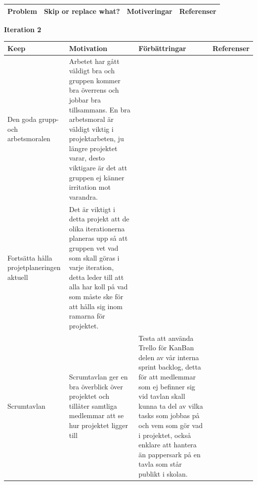 \documentclass[conference,a4paper]{IEEEtran}
\newcommand\Tstrut{\rule{0pt}{2.6ex}}       %
\newcommand\Bstrut{\rule[-0.9ex]{0pt}{0pt}} %
\newcommand{\TBstrut}{\Tstrut\Bstrut} %
\begin{document}
\begin{table}[H]
	\small
  \centering
	\begin{tabular}{|p{1.5cm}|p{2cm}|p{1.8cm}|p{1.5cm}|} %
    \hline
    Problem & Skip or replace what? & Motiveringar & Referenser \TBstrut \\
    \hline
  \end{tabular}
\end{table}

\textbf{Iteration 2}


\begin{table}[H]
	\small
  \centering
	\begin{tabular}{|p{1.5cm}|p{2cm}|p{1.8cm}|p{1.5cm}|} %
    \hline
    Keep & Motivation & Förbättringar & Referenser \TBstrut \\
    \hline
    Den goda grupp- och arbetsmoralen & Arbetet har gått väldigt bra och gruppen kommer bra överrens och jobbar bra tillsammans. En bra arbetsmoral är väldigt viktig i projektarbeten, ju längre projektet varar, desto viktigare är det att gruppen ej känner irritation mot varandra. &  & \TBstrut \\
    \hline
    Fortsätta hålla projetplaneringen aktuell & Det är viktigt i detta projekt att de olika iterationerna planeras upp så att gruppen vet vad som skall göras i varje iteration, detta leder till att alla har koll på vad som måste ske för att hålla sig inom ramarna för projektet. & & \TBstrut \\
    \hline
    Scrumtavlan & Scrumtavlan ger en bra överblick över projektet och tillåter samtliga medlemmar att se hur projektet ligger till & Testa att använda Trello för KanBan delen av vår interna sprint backlog, detta för att medlemmar som ej befinner sig vid tavlan skall kunna ta del av vilka tasks som jobbas på och vem som gör vad i projektet, också enklare att hantera än pappersark på en tavla som står publikt i skolan. & \TBstrut \\
    \hline
  \end{tabular}
\end{table}
\end{document}
